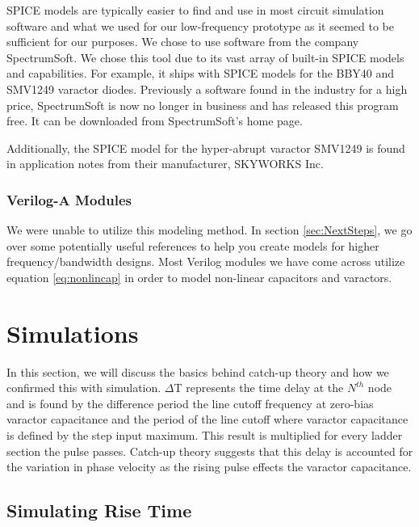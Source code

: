 \documentclass[journal]{IEEEtran} \usepackage[english]{babel}
\begin{document}
SPICE models are typically easier to find and use in most circuit simulation
software and what we used for our low-frequency prototype as it seemed to be
sufficient for our purposes. We chose to use software from the company
SpectrumSoft. We chose this tool due to its vast array of built-in SPICE models
and capabilities. For example, it ships with SPICE models for the BBY40 and
SMV1249 varactor diodes. Previously a software found in the industry for a high
price, SpectrumSoft is now no longer in business and has released this program
free. It can be downloaded from SpectrumSoft's home page.


Additionally, the SPICE model for the hyper-abrupt varactor SMV1249 is found in
application notes from their manufacturer, SKYWORKS Inc.




\subsubsection{Verilog-A Modules}\label{subsub:VerilogAMS}

We were unable to utilize this modeling method. In section \ref{sec:NextSteps}, 
we go over some potentially useful references to help you create models for
higher frequency/bandwidth designs. Most Verilog modules we have come across
utilize equation \ref{eq:nonlincap} in order to model non-linear capacitors and
varactors.







\section{ Simulations }\label{sec:sims}

In this section, we will discuss the basics behind catch-up
theory\cite{wilson1991pulse} and how we confirmed this with simulation.
$\Delta$T represents the time delay at the $N^{th}$ node and is found by the
difference period the line cutoff frequency at zero-bias varactor capacitance
and the period of the line cutoff where varactor capacitance is defined by the
step input maximum. This result is multiplied for every ladder section the pulse
passes. Catch-up theory suggests that this delay is accounted for the variation
in phase velocity as the rising pulse effects the varactor capacitance.

\subsection{Simulating Rise Time}\label{sub:simsRise}
\end{document}
